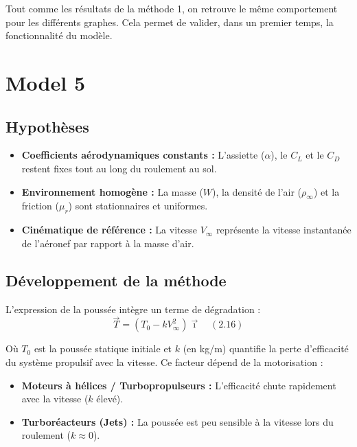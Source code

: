 				Tout comme les résultats de la méthode 1, on retrouve le même comportement pour
				 les différents graphes. Cela permet de valider, dans un premier temps, la fonctionnalité du modèle. 
			
	
			
			
			
			
			
		
		
		
		
		
		
		
		
		
		
		
		\section{Model 5}
		
			\subsection{Hypothèses}
				\begin{itemize}
					
					\item \textbf{Coefficients aérodynamiques constants :} L'assiette ($\alpha$), le $C_L$ et le $C_D$ restent fixes tout au long du roulement au sol.
					\item \textbf{Environnement homogène :} La masse ($W$), la densité de l'air ($\rho_\infty$) et la friction ($\mu_r$) sont stationnaires et uniformes.
					\item \textbf{Cinématique de référence :} La vitesse $V_\infty$ représente la vitesse instantanée de l'aéronef par rapport à la masse d'air.
				\end{itemize}
				
				\subsection{Développement de la méthode}
				L'expression de la poussée intègre un terme de dégradation  :
				\begin{equation}
					\vec{T} = (T_0 - kV_\infty^2)\vec{\imath} \quad (2.16)
				\end{equation}
				
				Où $T_0$ est la poussée statique initiale et $k$ (en kg/m) quantifie la perte d'efficacité du système propulsif avec la vitesse. Ce facteur dépend de la motorisation :
				\begin{itemize}
					\item \textbf{Moteurs à hélices / Turbopropulseurs :} L'efficacité chute rapidement avec la vitesse ($k$ élevé).
					\item \textbf{Turboréacteurs (Jets) :} La poussée est peu sensible à la vitesse lors du roulement ($k \approx 0$).
				\end{itemize}
				
